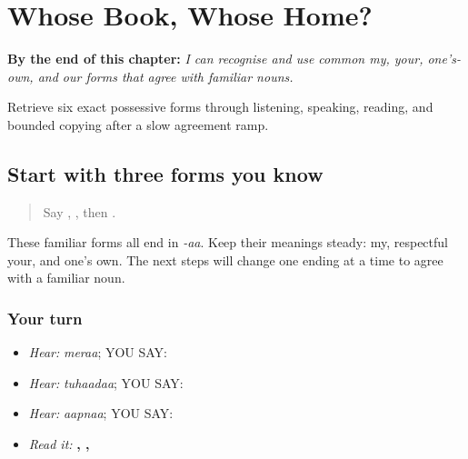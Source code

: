 
\chapter{Whose Book, Whose Home?}
\label{ch:pa-a2-possessive-agreement}

\begin{chapteropening}
\textbf{By the end of this chapter:} \emph{I can recognise and use common my, your, one's-own, and our forms that agree with familiar nouns.}

Retrieve six exact possessive forms through listening, speaking, reading, and bounded copying after a slow agreement ramp.
\end{chapteropening}

\section[(possessive base review)]{Start with three forms you know}

\label{lesson:PA-C185-possessive-return}



\begin{quote}
Say \textbf{}, \textbf{}, then \textbf{}.
\end{quote}

\begin{grammarlens}[title={Grammar Lens: the ending will follow the owned noun}]
These familiar forms all end in \emph{-aa}. Keep their meanings steady: my, respectful your, and one's own. The next steps will change one ending at a time to agree with a familiar noun.
\end{grammarlens}

\subsection*{Your turn}
\begin{itemize}
\raggedright
  \item \emph{Hear:} \emph{meraa}; YOU SAY: \textbf{}
  \item \emph{Hear:} \emph{tuhaadaa}; YOU SAY: \textbf{}
  \item \emph{Hear:} \emph{aapnaa}; YOU SAY: \textbf{}
  \item \emph{Read it:} \textbf{, , }
\end{itemize}


